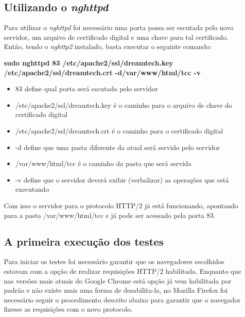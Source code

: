 \subsection{Utilizando o \textit{nghttpd}}
\label{utilizandoonghttpd}

Para utilizar o \textit{nghttpd} foi necessário uma porta possa ser escutada pelo novo servidor, um arquivo de certificado digital e uma chave para tal certificado. Então, tendo o \textit{nghttp2} instalado, basta executar o seguinte comando:

\textbf{sudo nghttpd 83 /etc/apache2/ssl/dreamtech.key /etc/apache2/ssl/dreamtech.crt -d/var/www/html/tcc -v}

\begin{itemize}
	\item 83 define qual porta será escutada pelo servidor
	\item /etc/apache2/ssl/dreamtech.key é o caminho para o arquivo de chave do certificado digital
	\item /etc/apache2/ssl/dreamtech.crt é o caminho para o certificado digital
	\item -d define que uma pasta diferente da atual será servido pelo servidor
	\item /var/www/html/tcc é o caminho da pasta que será servida
	\item -v define que o servidor deverá exibir (verbalizar) as operações que está executando
\end{itemize}

Com isso o servidor para o protocolo HTTP/2 já está funcionando, apontando para a pasta /var/www/html/tcc e já pode ser acessado pela porta 83.

\subsection{A primeira execução dos testes}
\label{aprimeiraexecucaodostestes}

Para iniciar os testes foi necessário garantir que os navegadores escolhidos estavam com a opção de realizar requisições HTTP/2 habilitada. Enquanto que nas versões mais atuais do Google Chrome está opção já vem habilitada por padrão e não existe mais uma forma de desabilita-la, no Mozilla Firefox foi necessário seguir o procedimento descrito abaixo para garantir que o navegador fizesse as requisições com o novo protocolo.


